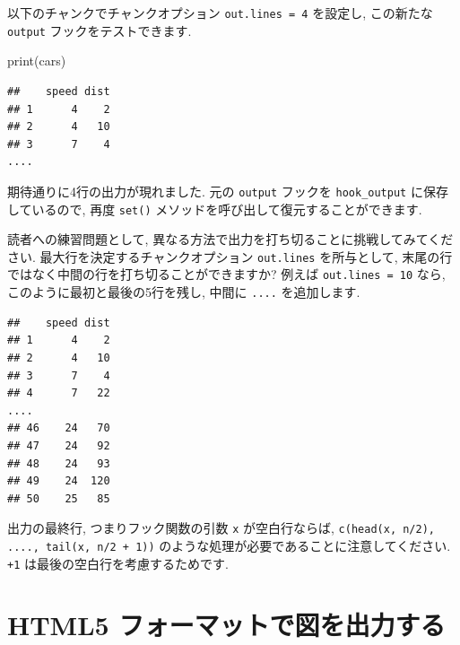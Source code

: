 \documentclass[
  11pt,
  lualatex,
  ja=standard]{bxjsreport}
\newenvironment{Shaded}{\begin{snugshade}}{\end{snugshade}}
\newcommand{\AttributeTok}[1]{\textcolor[rgb]{0.77,0.63,0.00}{#1}}
\newcommand{\FunctionTok}[1]{\textcolor[rgb]{0.00,0.00,0.00}{#1}}
\newcommand{\NormalTok}[1]{#1}
\newcommand{\SpecialCharTok}[1]{\textcolor[rgb]{0.00,0.00,0.00}{#1}}
\begin{document}
以下のチャンクでチャンクオプション \texttt{out.lines = 4} を設定し, この新たな \texttt{output} フックをテストできます.

\begin{Shaded}
\begin{Highlighting}[numbers=left,,]
\FunctionTok{print}\NormalTok{(cars)}
\end{Highlighting}
\end{Shaded}

\begin{verbatim}
##    speed dist
## 1      4    2
## 2      4   10
## 3      7    4
....
\end{verbatim}

期待通りに4行の出力が現れました. 元の \texttt{output} フックを \texttt{hook\_output} に保存しているので, 再度 \texttt{set()} メソッドを呼び出して復元することができます.

\begin{Shaded}
\end{Shaded}

読者への練習問題として, 異なる方法で出力を打ち切ることに挑戦してみてください. 最大行を決定するチャンクオプション \texttt{out.lines} を所与として, 末尾の行ではなく中間の行を打ち切ることができますか? 例えば \texttt{out.lines = 10} なら, このように最初と最後の5行を残し, 中間に \texttt{....} を追加します.

\begin{verbatim}
##    speed dist
## 1      4    2
## 2      4   10
## 3      7    4
## 4      7   22
....
## 46    24   70
## 47    24   92
## 48    24   93
## 49    24  120
## 50    25   85
\end{verbatim}

出力の最終行, つまりフック関数の引数 \texttt{x} が空白行ならば, \texttt{c(head(x, n/2), \textquotesingle{}....\textquotesingle{},\ tail(x,\ n/2\ +\ 1))} のような処理が必要であることに注意してください. \texttt{+1} は最後の空白行を考慮するためです.

\hypertarget{hook-html5}{%
\section{HTML5 フォーマットで図を出力する}\label{hook-html5}}
\end{document}
